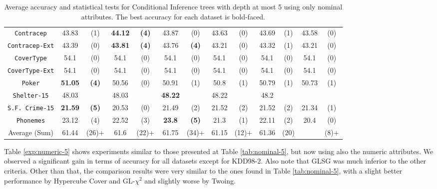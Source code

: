 \begin{table}
\begin{tabular}{c|cc|cc|cc|cc|cc|cc}
{\tt Contracep}    &43.83       & (1)       & {\bf 44.12} & {\bf (4)} & 43.87       & (0)       & 43.63       & (0)       & 43.69       & (1)         & 43.58       & (0)         \\
{\tt Contracep-Ext}&43.39       & (0)       & {\bf 43.81} & {\bf (4)} & 43.76       & {\bf (4)} & 43.21       & (0)       & 43.32       & (1)         & 43.21       & (0)         \\
{\tt CoverType}    &54.1        & (0)       & 54.1        & (0)       & 54.1        & (0)       & 54.1        & (0)       & 54.1        & (0)         & 54.1        & (0)         \\
{\tt CoverType-Ext}&54.1        & (0)       & 54.1        & (0)       & 54.1        & (0)       & 54.1        & (0)       & 54.1        & (0)         & 54.1        & (0)         \\
{\tt Poker}        &{\bf 51.05} & {\bf (4)} & 50.56       & (0)       & 50.91       & (1)       & 50.8        & (1)       & 50.79       & (1)         & 50.73       & (1)         \\  
{\tt Shelter-15}   & 48.03      &           & 48.03       &           & {\bf 48.22} &           & 48.22       &           & 48.2        &             &             &             \\   
{\tt S.F. Crime-15}&{\bf 21.59} & {\bf (5)} & 20.53       & (0)       & 21.49       & (2)       & 21.52       & (2)       & 21.52       & (2)         & 21.34       & (1)         \\ 
{\tt Phonemes}     & 23.12      & (4)       & 22.52       & (3)       & {\bf 23.8 } & {\bf (5)} & 21.3        & (1)       & 22.11       & (2)         & 20.4        & (0)         \\ 
\hline
Average (Sum)      & 61.44      & (26)+     & 61.6        & (22)+     & 61.75       & (34)+     & 61.15       & (12)+     & 61.36       & (20)        &             & (8)+
       \end{tabular}
    \caption{Average accuracy and statistical tests  for  Conditional Inference trees 
with depth at most 5 using only nominal attributes. The best accuracy for each dataset is bold-faced.}
\label{tab:ctree-5}
\end{table}


Table \ref{exp:numeric-5} shows experiments  similar to those presented at Table \ref{tab:nominal-5}, but now using also the numeric attributes. We observed a significant gain in terms of accuracy for all datasets except for KDD98-2. Also note that GLSG was much inferior to the other criteria. Other than that, the comparison results were very similar to the ones found in Table \ref{tab:nominal-5}, with a slight better performance by Hypercube Cover and GL-$\chi^2$ and slightly worse by Twoing.

